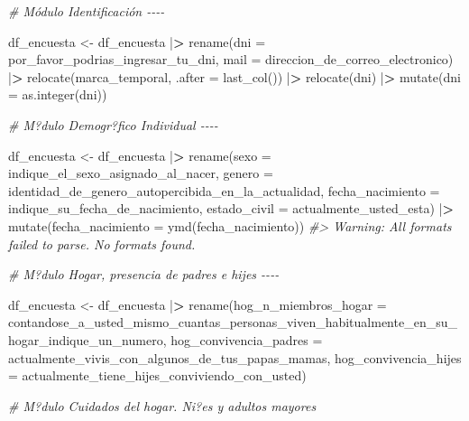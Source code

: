 \documentclass[
]{book}
\newenvironment{Shaded}{\begin{snugshade}}{\end{snugshade}}
\newcommand{\AttributeTok}[1]{\textcolor[rgb]{0.77,0.63,0.00}{#1}}
\newcommand{\CommentTok}[1]{\textcolor[rgb]{0.56,0.35,0.01}{\textit{#1}}}
\newcommand{\ErrorTok}[1]{\textcolor[rgb]{0.64,0.00,0.00}{\textbf{#1}}}
\newcommand{\FunctionTok}[1]{\textcolor[rgb]{0.00,0.00,0.00}{#1}}
\newcommand{\NormalTok}[1]{#1}
\newcommand{\OtherTok}[1]{\textcolor[rgb]{0.56,0.35,0.01}{#1}}
\newcommand{\SpecialCharTok}[1]{\textcolor[rgb]{0.00,0.00,0.00}{#1}}
\theoremstyle{definition}
\theoremstyle{definition}
\theoremstyle{definition}
\theoremstyle{definition}
\theoremstyle{remark}
\begin{document}
\begin{Shaded}
\begin{Highlighting}[]
\CommentTok{\# Módulo Identificación {-}{-}{-}{-}}

\NormalTok{df\_encuesta }\OtherTok{\textless{}{-}}\NormalTok{ df\_encuesta }\SpecialCharTok{|}\ErrorTok{\textgreater{}}
               \FunctionTok{rename}\NormalTok{(}\AttributeTok{dni =}\NormalTok{ por\_favor\_podrias\_ingresar\_tu\_dni,}
                      \AttributeTok{mail =}\NormalTok{ direccion\_de\_correo\_electronico) }\SpecialCharTok{|}\ErrorTok{\textgreater{}}
               \FunctionTok{relocate}\NormalTok{(marca\_temporal, }\AttributeTok{.after =} \FunctionTok{last\_col}\NormalTok{()) }\SpecialCharTok{|}\ErrorTok{\textgreater{}}
               \FunctionTok{relocate}\NormalTok{(dni) }\SpecialCharTok{|}\ErrorTok{\textgreater{}}
               \FunctionTok{mutate}\NormalTok{(}\AttributeTok{dni =} \FunctionTok{as.integer}\NormalTok{(dni))}

\CommentTok{\# M?dulo Demogr?fico Individual {-}{-}{-}{-}}

\NormalTok{df\_encuesta }\OtherTok{\textless{}{-}}\NormalTok{ df\_encuesta }\SpecialCharTok{|}\ErrorTok{\textgreater{}}
               \FunctionTok{rename}\NormalTok{(}\AttributeTok{sexo =}\NormalTok{ indique\_el\_sexo\_asignado\_al\_nacer,}
                      \AttributeTok{genero =}\NormalTok{ identidad\_de\_genero\_autopercibida\_en\_la\_actualidad,}
                      \AttributeTok{fecha\_nacimiento =}\NormalTok{ indique\_su\_fecha\_de\_nacimiento,}
                      \AttributeTok{estado\_civil =}\NormalTok{ actualmente\_usted\_esta) }\SpecialCharTok{|}\ErrorTok{\textgreater{}}
               \FunctionTok{mutate}\NormalTok{(}\AttributeTok{fecha\_nacimiento =} \FunctionTok{ymd}\NormalTok{(fecha\_nacimiento))}
\CommentTok{\#\textgreater{} Warning: All formats failed to parse. No formats found.}

\CommentTok{\# M?dulo Hogar, presencia de padres e hijes {-}{-}{-}{-}}

\NormalTok{df\_encuesta }\OtherTok{\textless{}{-}}\NormalTok{ df\_encuesta }\SpecialCharTok{|}\ErrorTok{\textgreater{}}
\FunctionTok{rename}\NormalTok{(}\AttributeTok{hog\_n\_miembros\_hogar =}\NormalTok{ contandose\_a\_usted\_mismo\_cuantas\_personas\_viven\_habitualmente\_en\_su\_hogar\_indique\_un\_numero,}
       \AttributeTok{hog\_convivencia\_padres =}\NormalTok{ actualmente\_vivis\_con\_algunos\_de\_tus\_papas\_mamas,}
       \AttributeTok{hog\_convivencia\_hijes =}\NormalTok{ actualmente\_tiene\_hijes\_conviviendo\_con\_usted)}
       
\CommentTok{\# M?dulo Cuidados del hogar. Ni?es y adultos mayores}


\end{Highlighting}
\end{Shaded}
\end{document}
